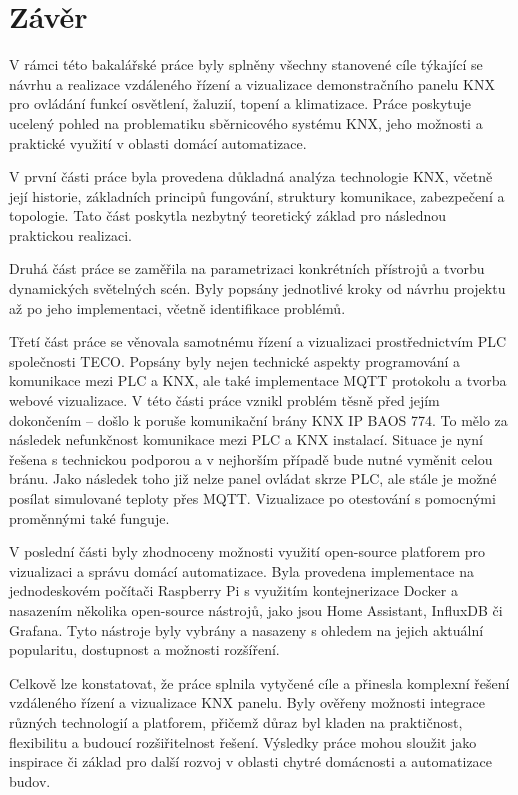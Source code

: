 \chapter*{Závěr}
{}

V rámci této bakalářské práce byly splněny všechny stanovené cíle týkající se návrhu a realizace vzdáleného řízení a vizualizace demonstračního panelu KNX pro ovládání funkcí osvětlení, žaluzií, topení a klimatizace. Práce poskytuje ucelený pohled na problematiku sběrnicového systému KNX, jeho možnosti a praktické využití v oblasti domácí automatizace. 

V první části práce byla provedena důkladná analýza technologie KNX, včetně její historie, základních principů fungování, struktury komunikace, zabezpečení a topologie. Tato část poskytla nezbytný teoretický základ pro následnou praktickou realizaci. 

Druhá část práce se zaměřila na parametrizaci konkrétních přístrojů a tvorbu dynamických světelných scén. Byly popsány jednotlivé kroky od návrhu projektu až po jeho implementaci, včetně identifikace problémů. 

Třetí část práce se věnovala samotnému řízení a vizualizaci prostřednictvím PLC společnosti TECO. Popsány byly nejen technické aspekty programování a komunikace mezi PLC a KNX, ale také implementace MQTT protokolu a tvorba webové vizualizace. V této části práce vznikl problém těsně před jejím dokončením – došlo k poruše komunikační brány KNX IP BAOS 774. To mělo za následek nefunkčnost komunikace mezi PLC a KNX instalací. Situace je nyní řešena s technickou podporou a v nejhorším případě bude nutné vyměnit celou bránu. Jako následek toho již nelze panel ovládat skrze PLC, ale stále je možné posílat simulované teploty přes MQTT. Vizualizace po otestování s pomocnými proměnnými také funguje.

V poslední části byly zhodnoceny možnosti využití open-source platforem pro vizualizaci a správu domácí automatizace. Byla provedena implementace na jednodeskovém počítači Raspberry Pi s využitím kontejnerizace Docker a nasazením několika open-source nástrojů, jako jsou Home Assistant, InfluxDB či Grafana. Tyto nástroje byly vybrány a nasazeny s ohledem na jejich aktuální popularitu, dostupnost a možnosti rozšíření.

Celkově lze konstatovat, že práce splnila vytyčené cíle a přinesla komplexní řešení vzdáleného řízení a vizualizace KNX panelu. Byly ověřeny možnosti integrace různých technologií a platforem, přičemž důraz byl kladen na praktičnost, flexibilitu a budoucí rozšiřitelnost řešení. Výsledky práce mohou sloužit jako inspirace či základ pro další rozvoj v oblasti chytré domácnosti a automatizace budov.
